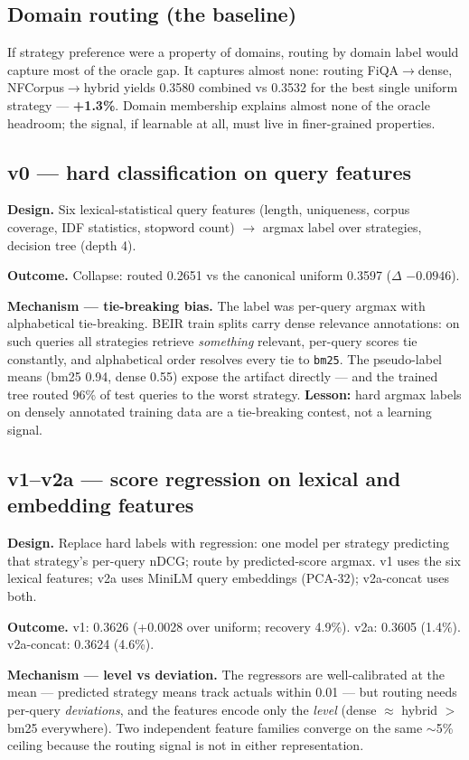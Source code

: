 \documentclass[11pt]{article}
\begin{document}
\subsection{Domain routing (the baseline)}
If strategy preference were a property of domains, routing by domain label would capture most of the oracle gap. It captures almost none: routing FiQA$\to$dense, NFCorpus$\to$hybrid yields 0.3580 combined vs 0.3532 for the best single uniform strategy --- \textbf{+1.3\%}. Domain membership explains almost none of the oracle headroom; the signal, if learnable at all, must live in finer-grained properties.

\subsection{v0 --- hard classification on query features}\label{sec:v0}
\textbf{Design.} Six lexical-statistical query features (length, uniqueness, corpus coverage, IDF statistics, stopword count) $\to$ argmax label over strategies, decision tree (depth 4).

\textbf{Outcome.} Collapse: routed 0.2651 vs the canonical uniform 0.3597 ($\Delta$ $-0.0946$).

\textbf{Mechanism --- tie-breaking bias.} The label was per-query argmax with alphabetical tie-breaking. BEIR train splits carry dense relevance annotations: on such queries all strategies retrieve \emph{something} relevant, per-query scores tie constantly, and alphabetical order resolves every tie to \texttt{bm25}. The pseudo-label means (bm25 0.94, dense 0.55) expose the artifact directly --- and the trained tree routed 96\% of test queries to the worst strategy. \textbf{Lesson:} hard argmax labels on densely annotated training data are a tie-breaking contest, not a learning signal.

\subsection{v1--v2a --- score regression on lexical and embedding features}
\textbf{Design.} Replace hard labels with regression: one model per strategy predicting that strategy's per-query nDCG; route by predicted-score argmax. v1 uses the six lexical features; v2a uses MiniLM query embeddings (PCA-32); v2a-concat uses both.

\textbf{Outcome.} v1: 0.3626 (+0.0028 over uniform; recovery 4.9\%). v2a: 0.3605 (1.4\%). v2a-concat: 0.3624 (4.6\%).

\textbf{Mechanism --- level vs deviation.} The regressors are well-calibrated at the mean --- predicted strategy means track actuals within 0.01 --- but routing needs per-query \emph{deviations}, and the features encode only the \emph{level} (dense $\approx$ hybrid $>$ bm25 everywhere). Two independent feature families converge on the same $\sim$5\% ceiling because the routing signal is not in either representation.
\end{document}
